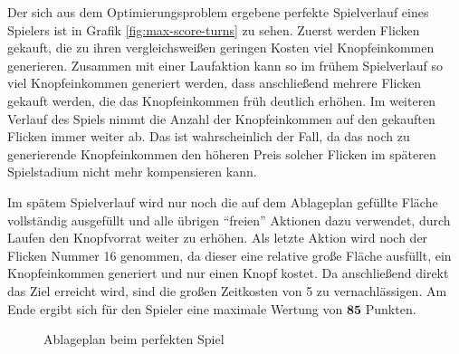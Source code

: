 Der sich aus dem Optimierungsproblem ergebene perfekte Spielverlauf eines Spielers ist in Grafik \ref{fig:max-score-turns} zu sehen. Zuerst werden Flicken gekauft, die zu ihren vergleichsweißen geringen Kosten viel Knopfeinkommen generieren. Zusammen mit einer Laufaktion kann so im frühem Spielverlauf so viel Knopfeinkommen generiert werden, dass anschließend mehrere Flicken gekauft werden, die das Knopfeinkommen früh deutlich erhöhen. Im weiteren Verlauf des Spiels nimmt die Anzahl der Knopfeinkommen auf den gekauften Flicken immer weiter ab. Das ist wahrscheinlich der Fall, da das noch zu generierende Knopfeinkommen den höheren Preis solcher Flicken im späteren Spielstadium nicht mehr kompensieren kann.

Im spätem Spielverlauf wird nur noch die auf dem Ablageplan gefüllte Fläche vollständig ausgefüllt und alle übrigen \enquote{freien} Aktionen dazu verwendet, durch Laufen den Knopfvorrat weiter zu erhöhen. Als letzte Aktion wird noch der Flicken Nummer 16 genommen, da dieser eine relative große Fläche ausfüllt, ein Knopfeinkommen generiert und nur einen Knopf kostet. Da anschließend direkt das Ziel erreicht wird, sind die großen Zeitkosten von 5 zu vernachlässigen. Am Ende ergibt sich für den Spieler eine maximale Wertung von $\boldsymbol{85}$ Punkten.

\begin{figure}
    \vspace*{-0.75cm}
    \centering
    \caption[Ablageplan beim perfekten Spiel]{\unskip}
    Ablageplan beim perfekten Spiel
    \label{fig:max-score-quilt-board}
    \vspace*{-0.75cm}
\end{figure}

